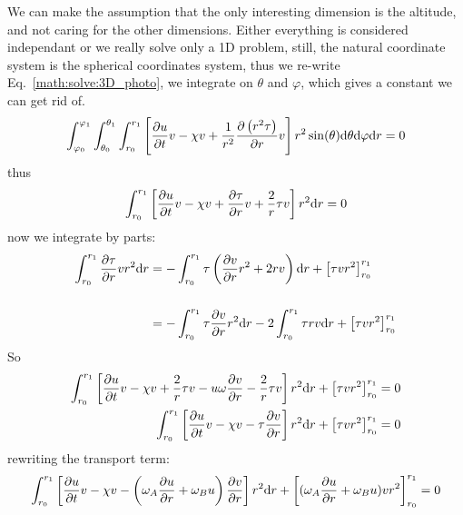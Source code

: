 We can make the assumption that the only interesting dimension is the altitude, and
not caring for the other dimensions. Either everything
is considered independant or we really solve only a 1D problem, still,
the natural coordinate system is the spherical
coordinates system, thus we re-write Eq.~\ref{math:solve:3D_photo}, 
we integrate on $\theta$ and $\varphi$,
which gives a constant we can get rid of.
\begin{equation}
\int_{\varphi_0}^{\varphi_1}\int_{\theta_0}^{\theta_1}\int_{r_0}^{r_1}\left[   \frac{\partial u}{\partial t} v 
                       - \chi v + \frac{1}{r^2}\frac{\partial\left(r^2\tau\right)}{\partial r} v
                \right] r^2\sin(\theta)\mathrm{d}\theta\mathrm{d}\varphi\mathrm{d} r = 0
\end{equation}
thus
\begin{equation}
\int_{r_0}^{r_1}\left[   \frac{\partial u}{\partial t} v 
                       - \chi v + \frac{\partial\tau}{\partial r} v
                       + \frac{2}{r}\tau v
                \right] r^2\mathrm{d} r = 0
\end{equation}
now we integrate by parts:
\begin{equation}
\begin{split}
\int_{r_0}^{r_1}\frac{\partial\tau}{\partial r} v r^2 \mathrm{d} r 
   & = - \int_{r_0}^{r_1}\tau \left(\frac{\partial v}{\partial r}r^2 + 2 r v\right) \mathrm{d} r + \left[\tau v r^2\right]_{r_0}^{r_1}
        \\[\baselineskip]
   & = - \int_{r_0}^{r_1}\tau \frac{\partial v}{\partial r} r^2  \mathrm{d} r - 2 \int_{r_0}^{r_1}\tau  r v \mathrm{d} r  + \left[\tau v r^2\right]_{r_0}^{r_1}
\end{split}
\end{equation}
So
\begin{equation}
\begin{split}
\int_{r_0}^{r_1} \left[   \frac{\partial u}{\partial t} v 
                        - \chi v
                        + \frac{2}{r} \tau v
                        - u\omega\frac{\partial v}{\partial r}
                        - \frac{2}{r} \tau v
                 \right] r^2 \mathrm{d} r 
     + \left[\tau v r^2\right]_{r_0}^{r_1}   & = 0 \\
\int_{r_0}^{r_1} \left[   \frac{\partial u}{\partial t} v 
                        - \chi v
                        - \tau\frac{\partial v}{\partial r}
                 \right] r^2 \mathrm{d} r 
     + \left[\tau v r^2\right]_{r_0}^{r_1}   & = 0 
\end{split}
\end{equation}
rewriting the transport term:
\begin{equation}
\int_{r_0}^{r_1} \left[   \frac{\partial u}{\partial t} v 
                        - \chi v
                        - \left(\omega_A \frac{\partial u}{\partial r} + \omega_B u \right)\frac{\partial v}{\partial r}
                 \right] r^2 \mathrm{d} r 
     + \left[(\omega_A \frac{\partial u}{\partial r} + \omega_B u) v r^2\right]_{r_0}^{r_1}  = 0 
\end{equation}

